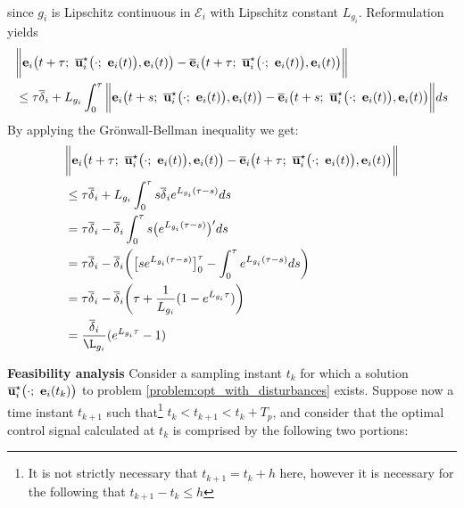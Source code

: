 \begin{gg_box}
\begin{align}
\end{align}
since $g_i$ is Lipschitz continuous in $\mathcal{E}_i$ with Lipschitz constant
$L_{g_i}$. Reformulation yields
\begin{align}
  &\bigg\| \vect{e}_i\big(t+\tau;\ \overline{\vect{u}}_i^{\star}\big(\cdot;\ \vect{e}_i(t)\big), \vect{e}_i(t)\big) -
  \overline{\vect{e}}_i\big(t+\tau;\ \overline{\vect{u}}_i^{\star}\big(\cdot;\ \vect{e}_i(t)\big), \vect{e}_i(t)\big) \bigg\| \\
  &\leq \tau \overline{\delta}_i
  + L_{g_i} \int_{0}^{\tau} \bigg\| \vect{e}_i\big(t + s;\ \overline{\vect{u}}_i^{\star}\big(\cdot;\ \vect{e}_i(t)\big), \vect{e}_i(t)\big) -
  \overline{\vect{e}}_i\big(t + s;\ \overline{\vect{u}}_i^{\star}\big(\cdot;\ \vect{e}_i(t)\big), \vect{e}_i(t)\big) \bigg\| ds \\
\end{align}
By applying the Gr\"{o}nwall-Bellman inequality we get:
\begin{align}
  &\bigg\| \vect{e}_i\big(t + \tau;\ \overline{\vect{u}}_i^{\star}\big(\cdot;\ \vect{e}_i(t)\big), \vect{e}_i(t)\big) -
    \overline{\vect{e}}_i\big(t + \tau;\ \overline{\vect{u}}_i^{\star}\big(\cdot;\ \vect{e}_i(t)\big), \vect{e}_i(t)\big) \bigg\| \\
  &\leq \tau \overline{\delta}_i +  L_{g_i} \int_{0}^{\tau} s \overline{\delta}_i e^{L_{g_i}(\tau - s)} ds \\
  &= \tau \overline{\delta}_i - \overline{\delta}_i \int_{0}^{\tau} s  \big(e^{L_{g_i}(\tau - s)}\big)' ds \\
  &= \tau \overline{\delta}_i -
    \overline{\delta}_i \bigg( \big[s e^{L_{g_i}(\tau - s)}\big]_0^{\tau}
      - \int_{0}^{\tau} e^{L_{g_i}(\tau - s)}ds\bigg) \\
  &= \tau \overline{\delta}_i - \overline{\delta}_i \bigg( \tau + \dfrac{1}{L_{g_i}} (1- e^{L_{g_i}\tau})\bigg) \\
  &= \dfrac{\overline{\delta}_i}{\L_{g_i}} (e^{L_{g_i}\tau} - 1)
\end{align}
\qedsymbol
\end{gg_box}


\textbf{Feasibility analysis}
Consider a sampling instant $t_k$ for which a
solution $\overline{\vect{u}}_i^{\star}\big(\cdot;\ \vect{e}_i(t_k)\big)$ to
problem \eqref{problem:opt_with_disturbances} exists.
Suppose now a time instant $t_{k+1}$ such that\footnote{It is not strictly necessary
that $t_{k+1} = t_k + h$ here, however it is necessary for the following that
$t_{k+1} - t_k \leq h$} $t_k < t_{k+1} < t_k + T_p$, and consider that the
optimal control signal calculated at $t_k$ is comprised by the following two
portions:


